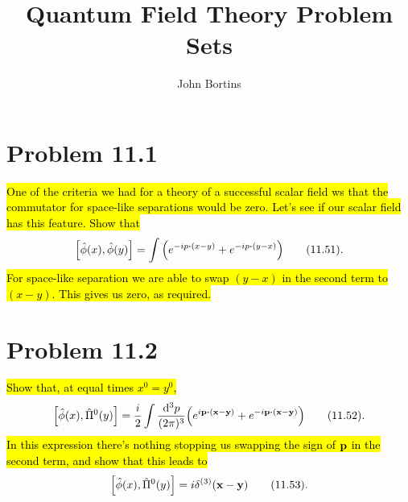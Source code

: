 \documentclass{article}
\title{Quantum Field Theory Problem Sets}
\author{John Bortins}
\begin{document}
\maketitle{}

\section*{Problem 11.1}
\begin{quoting}
    \hl{One of the criteria we had for a theory of a successful scalar field ws that the commutator for space-like separations would be zero. Let's see if our scalar field has this feature. Show that}\[\bqty{\hat{\phi}(x),\hat{\phi}(y)}=\int\pqty{e^{-ip\vdot(x-y)}+e^{-ip\vdot(y-x)}}\qquad(11.51).\]\hl{For space-like separation we are able to swap $(y-x)$ in the second term to $(x-y)$. This gives us zero, as required.}
\end{quoting}

\section*{Problem 11.2}
\begin{quoting}
    \hl{Show that, at equal times $x^0=y^0$,}\[\bqty{\hat{\phi}(x),\hat{\Pi}^0(y)}=\frac{i}{2}\int\frac{\dd[3]{p}}{(2\pi)^3}\pqty{e^{i\vb{p\vdot(\vb{x}-\vb{y})}}+e^{-i\vb{p\vdot(\vb{x}-\vb{y})}}}\qquad(11.52).\]\hl{In this expression there's nothing stopping us swapping the sign of $\vb{p}$ in the second term, and show that this leads to}\[\bqty{\hat{\phi}(x),\hat{\Pi}^0(y)}=i\delta^{(3)}(\vb{x}-\vb{y})\qquad(11.53).\]
\end{quoting}
\end{document}
